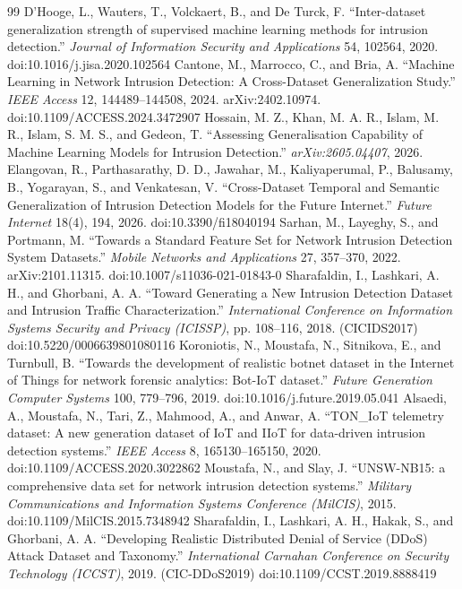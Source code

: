 \documentclass[preprint,12pt]{elsarticle}
\begin{document}
\begin{thebibliography}{99}
 D'Hooge, L., Wauters, T., Volckaert, B., and De Turck, F. ``Inter-dataset generalization strength of supervised machine learning methods for intrusion detection.'' \emph{Journal of Information Security and Applications} 54, 102564, 2020. doi:10.1016/j.jisa.2020.102564
 Cantone, M., Marrocco, C., and Bria, A. ``Machine Learning in Network Intrusion Detection: A Cross-Dataset Generalization Study.'' \emph{IEEE Access} 12, 144489--144508, 2024. arXiv:2402.10974. doi:10.1109/ACCESS.2024.3472907
 Hossain, M. Z., Khan, M. A. R., Islam, M. R., Islam, S. M. S., and Gedeon, T. ``Assessing Generalisation Capability of Machine Learning Models for Intrusion Detection.'' \emph{arXiv:2605.04407}, 2026.
 Elangovan, R., Parthasarathy, D. D., Jawahar, M., Kaliyaperumal, P., Balusamy, B., Yogarayan, S., and Venkatesan, V. ``Cross-Dataset Temporal and Semantic Generalization of Intrusion Detection Models for the Future Internet.'' \emph{Future Internet} 18(4), 194, 2026. doi:10.3390/fi18040194
 Sarhan, M., Layeghy, S., and Portmann, M. ``Towards a Standard Feature Set for Network Intrusion Detection System Datasets.'' \emph{Mobile Networks and Applications} 27, 357--370, 2022. arXiv:2101.11315. doi:10.1007/s11036-021-01843-0
 Sharafaldin, I., Lashkari, A. H., and Ghorbani, A. A. ``Toward Generating a New Intrusion Detection Dataset and Intrusion Traffic Characterization.'' \emph{International Conference on Information Systems Security and Privacy (ICISSP)}, pp. 108--116, 2018. (CICIDS2017) doi:10.5220/0006639801080116
 Koroniotis, N., Moustafa, N., Sitnikova, E., and Turnbull, B. ``Towards the development of realistic botnet dataset in the Internet of Things for network forensic analytics: Bot-IoT dataset.'' \emph{Future Generation Computer Systems} 100, 779--796, 2019. doi:10.1016/j.future.2019.05.041
 Alsaedi, A., Moustafa, N., Tari, Z., Mahmood, A., and Anwar, A. ``TON\_IoT telemetry dataset: A new generation dataset of IoT and IIoT for data-driven intrusion detection systems.'' \emph{IEEE Access} 8, 165130--165150, 2020. doi:10.1109/ACCESS.2020.3022862
 Moustafa, N., and Slay, J. ``UNSW-NB15: a comprehensive data set for network intrusion detection systems.'' \emph{Military Communications and Information Systems Conference (MilCIS)}, 2015. doi:10.1109/MilCIS.2015.7348942
 Sharafaldin, I., Lashkari, A. H., Hakak, S., and Ghorbani, A. A. ``Developing Realistic Distributed Denial of Service (DDoS) Attack Dataset and Taxonomy.'' \emph{International Carnahan Conference on Security Technology (ICCST)}, 2019. (CIC-DDoS2019) doi:10.1109/CCST.2019.8888419

\end{thebibliography}
\end{document}
